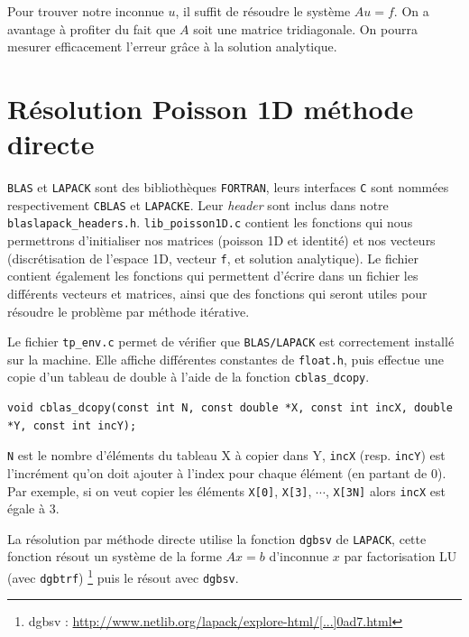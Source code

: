 \documentclass{article}
\begin{document}
Pour trouver notre inconnue $u$, il suffit de résoudre le système \(Au = f\). On a avantage à profiter du fait que $A$ soit une matrice tridiagonale. On pourra mesurer efficacement l'erreur grâce à la solution analytique.

\section{Résolution Poisson 1D méthode directe}

\texttt{BLAS} et \texttt{LAPACK} sont des bibliothèques \texttt{FORTRAN}, leurs interfaces \texttt{C} sont nommées respectivement \texttt{CBLAS} et \texttt{LAPACKE}. Leur \textit{header} sont inclus dans notre \texttt{blaslapack\_headers.h}. \texttt{lib\_poisson1D.c} contient les fonctions qui nous permettrons d'initialiser nos matrices (poisson 1D et identité) et nos vecteurs (discrétisation de l'espace 1D, vecteur \texttt{f}, et solution analytique). Le fichier contient également les fonctions qui permettent d'écrire dans un fichier les différents vecteurs et matrices, ainsi que des fonctions qui seront utiles pour résoudre le problème par méthode itérative.

Le fichier \texttt{tp\_env.c} permet de vérifier que \texttt{BLAS/LAPACK} est correctement installé sur la machine. Elle affiche différentes constantes de \texttt{float.h}, puis effectue une copie d'un tableau de double à l'aide de la fonction \texttt{cblas\_dcopy}.

\begin{scriptsize}
\begin{verbatim}
void cblas_dcopy(const int N, const double *X, const int incX, double *Y, const int incY);
\end{verbatim}
\end{scriptsize}
\texttt{N} est le nombre d'éléments du tableau X à copier dans Y, \texttt{incX} (resp. \texttt{incY}) est l'incrément qu'on doit ajouter à l'index pour chaque élément (en partant de 0). Par exemple, si on veut copier les éléments \texttt{X[0]}, \texttt{X[3]}, $\cdots$, \texttt{X[3N]} alors \texttt{incX} est égale à $3$.

La résolution par méthode directe utilise la fonction \texttt{dgbsv} de \texttt{LAPACK}, cette fonction résout un système de la forme $Ax = b$ d'inconnue $x$ par factorisation LU (avec \texttt{dgbtrf}) \footnote{dgbsv : \href{http://www.netlib.org/lapack/explore-html/d3/d49/group__double_g_bsolve_gafa35ce1d7865b80563bbed6317050ad7.html}{http://www.netlib.org/lapack/explore-html/[...]0ad7.html}} puis le résout avec \texttt{dgbsv}.
\end{document}

